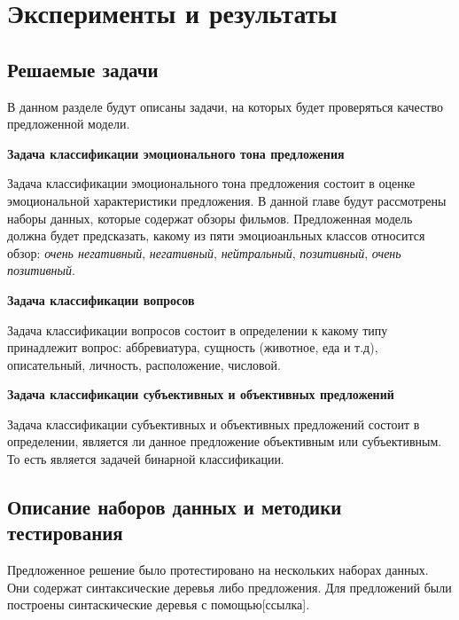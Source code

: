 
\chapter{Эксперименты и результаты}

\section{Решаемые задачи}
В данном разделе будут описаны задачи, на которых будет проверяться качество предложенной модели.
\vspace{5mm}

\noindent \textbf{Задача классификации эмоционального тона предложения}\par
Задача классификации эмоционального тона предложения состоит в оценке эмоциональной характеристики предложения. В данной главе будут рассмотрены наборы данных, которые содержат обзоры фильмов. 
Предложенная модель должна будет предсказать, какому из пяти эмоциоанльных классов относится обзор:
\emph{очень негативный}, \emph{негативный}, \emph{нейтральный}, \emph{позитивный}, \emph{очень позитивный}.
\vspace{5mm}

\noindent \textbf{Задача классификации вопросов}\par
Задача классификации вопросов состоит в определении к какому типу принадлежит вопрос:
аббревиатура, сущность (животное, еда и т.д), описательный, личность, расположение, числовой.
\vspace{5mm}

\noindent \textbf{Задача классификации субъективных и объективных предложений}\par
Задача классификации субъективных и объективных предложений состоит в определении, является ли данное предложение объективным или субъективным. То есть является задачей бинарной классификации.

\section{Описание наборов данных и методики тестирования}
Предложенное решение было протестировано на нескольких наборах данных. 
Они содержат синтаксические деревья либо предложения. 
Для предложений были построены синтаскические деревья с помощью[ссылка].
\vspace{5mm}


